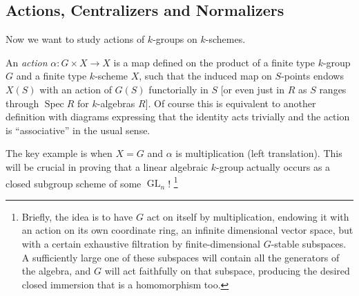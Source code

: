 \documentclass[10pt]{article}
\newcommand{\GL}{\operatorname{GL}}
\renewcommand{\(}{\left(}
\renewcommand{\)}{\right)}
\newcommand{\Spec}{\operatorname{Spec}}
\numberwithin{thm}{subsection}
\begin{document}
\subsection{Actions, Centralizers and Normalizers}
Now we want to study actions of $k$-groups on $k$-schemes.
\begin{defn}
An \textit{action} $\alpha:G\times X\to X$
is a map defined on the product of a finite type
$k$-group $G$
and a finite type $k$-scheme $X$,
such that the induced map on $S$-points
endows $X(S)$ with an action of $G(S)$ functorially in $S$
[or even just in $R$ as $S$ ranges through $\Spec R$
for $k$-algebras $R$].
Of course this is equivalent to another definition with diagrams
expressing that the identity acts trivially and the action is ``associative'' in the usual sense.
\end{defn}
The key example is when $X=G$ and $\alpha$ is multiplication (left translation).
This will be crucial in proving that a linear algebraic $k$-group actually occurs
as a closed subgroup scheme of some $\GL_n$! \footnote{Briefly, the idea is to have $G$ act on itself
by multiplication, endowing it with an action on its own coordinate ring, an infinite dimensional vector space, but with a certain exhaustive filtration by finite-dimensional $G$-stable subspaces. A sufficiently large one of these subspaces will contain all the generators of the algebra, and $G$ will act faithfully on that subspace, producing the desired closed immersion that is a homomorphism too.}
\end{document}
